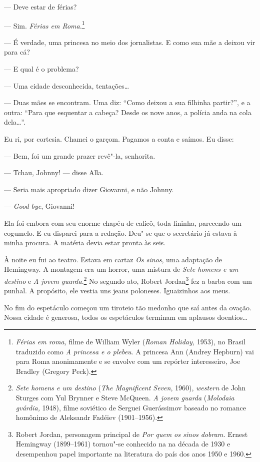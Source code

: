 --- Deve estar de férias?

--- Sim. \emph{Férias em Roma}.\footnote{\emph{Férias em roma,} filme de
  William Wyler (\emph{Roman Holiday,} 1953), no Brasil traduzido
  como \emph{A princesa e o plebeu}. A princesa Ann (Andrey Hepburn) vai
  para Roma anonimamente e se envolve com um repórter interesseiro, Joe
  Bradley (Gregory Peck).}

--- É verdade, uma princesa no meio dos jornalistas. E como sua mãe a
deixou vir para cá?

--- E qual é o problema?

--- Uma cidade desconhecida, tentações\ldots{}

--- Duas mães se encontram. Uma diz: ``Como deixou a sua filhinha
partir?'', e a outra: ``Para que esquentar a cabeça? Desde os nove anos,
a polícia anda na cola dela\ldots{}''.

Eu ri, por cortesia. Chamei o garçom. Pagamos a conta e saímos. Eu
disse:

--- Bem, foi um grande prazer revê"-la, senhorita.

--- Tchau, Johnny! --- disse Alla.

--- Seria mais apropriado dizer Giovanni, e não Johnny.

--- \emph{Good bye}, Giovanni!

Ela foi embora com seu enorme chapéu de calicô, toda fininha, parecendo
um cogumelo. E eu disparei para a redação. Deu"-se que o secretário já
estava à minha procura. A matéria devia estar pronta às seis.

À noite eu fui ao teatro. Estava em cartaz \emph{Os sinos}, uma
adaptação de Hemingway. A montagem era um horror, uma mistura de
\emph{Sete homens e um destino} e \emph{A jovem guarda}.\footnote{\emph{Sete
  homens e um destino} (\emph{The Magnificent Seven}, 1960),
  \emph{western} de John Sturges com Yul Brynner e Steve McQueen.
  \emph{A jovem guarda} (\emph{Molodaia gvárdia,} 1948), filme soviético
  de Serguei Guerássimov baseado no romance homônimo de Aleksandr
  Fadéiev (1901--1956).} No segundo ato, Robert Jordan\footnote{Robert
  Jordan, personagem principal de \emph{Por quem os sinos dobram.}
  Ernest Hemingway (1899--1961) tornou"-se conhecido na  na década de
  1930 e desempenhou papel importante na literatura do país dos anos
  1950 e 1960.} fez a barba com um punhal. A propósito, ele vestia uns
jeans poloneses. Iguaizinhos aos meus.

No fim do espetáculo começou um tiroteio tão medonho que saí antes da
ovação. Nossa cidade é generosa, todos os espetáculos terminam em
aplausos doentios\ldots{}

